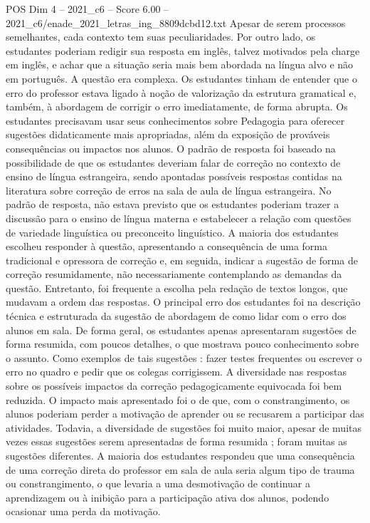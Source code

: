 \begin{textsample}{POS Dim 4 – 2021\_c6 – Score 6.00 – 2021\_c6/enade\_2021\_letras\_ing\_8809dcbd12.txt}
Apesar de serem processos semelhantes, cada contexto tem suas peculiaridades.
Por outro lado, os estudantes poderiam redigir sua resposta em inglês, talvez motivados pela charge em inglês, e achar que a situação seria mais bem abordada na língua alvo e não em português.
A questão era complexa.
Os estudantes tinham de entender que o erro do professor estava ligado à noção de valorização da estrutura gramatical e, também, à abordagem de corrigir o erro imediatamente, de forma abrupta.
Os estudantes precisavam usar seus conhecimentos sobre Pedagogia para oferecer sugestões didaticamente mais apropriadas, além da exposição de prováveis consequências ou impactos nos alunos.
O padrão de resposta foi baseado na possibilidade de que os estudantes deveriam falar de correção no contexto de ensino de língua estrangeira, sendo apontadas possíveis respostas contidas na literatura sobre correção de erros na sala de aula de língua estrangeira.
No padrão de resposta, não estava previsto que os estudantes poderiam trazer a discussão para o ensino de língua materna e estabelecer a relação com questões de variedade linguística ou preconceito linguístico.
A maioria dos estudantes escolheu responder à questão, apresentando a consequência de uma forma tradicional e opressora de correção e, em seguida, indicar a sugestão de forma de correção resumidamente, não necessariamente contemplando as demandas da questão.
Entretanto, foi frequente a escolha pela redação de textos longos, que mudavam a ordem das respostas.
O principal erro dos estudantes foi na descrição técnica e estruturada da sugestão de abordagem de como lidar com o erro dos alunos em sala.
De forma geral, os estudantes apenas apresentaram sugestões de forma resumida, com poucos detalhes, o que mostrava pouco conhecimento sobre o assunto.
Como exemplos de tais sugestões : fazer testes frequentes ou escrever o erro no quadro e pedir que os colegas corrigissem.
A diversidade nas respostas sobre os possíveis impactos da correção pedagogicamente equivocada foi bem reduzida.
O impacto mais apresentado foi o de que, com o constrangimento, os alunos poderiam perder a motivação de aprender ou se recusarem a participar das atividades.
Todavia, a diversidade de sugestões foi muito maior, apesar de muitas vezes essas sugestões serem apresentadas de forma resumida ; foram muitas as sugestões diferentes.
A maioria dos estudantes respondeu que uma consequência de uma correção direta do professor em sala de aula seria algum tipo de trauma ou constrangimento, o que levaria a uma desmotivação de continuar a aprendizagem ou à inibição para a participação ativa dos alunos, podendo ocasionar uma perda da motivação.

\end{textsample}
